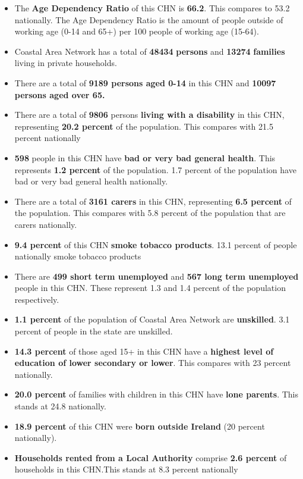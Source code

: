 \documentclass{article}
\begin{document}
\begin{itemize}

\item The \textbf{Age Dependency Ratio} of this CHN is  \textbf{66.2}. This compares to 53.2 nationally. The Age Dependency Ratio is the amount of people outside of working age (0-14 and 65+) per 100 people of working age (15-64). 

\item Coastal Area Network has a total of \textbf{\num{48434}} \textbf{persons} and  \textbf{\num{13274}} \textbf{families} living in private households.

\item There are a total of \textbf{\num{9189} persons aged 0-14} in this CHN and \textbf{\num{10097} persons aged over 65.} 

\item There are a total of \textbf{\num{9806}} persons \textbf{living with a disability} in this CHN, representing \textbf{20.2 percent} of the population. This compares with  21.5 percent nationally

\item \textbf{\num{598}} people in this CHN have \textbf{bad or very bad general health}. This represents \textbf{1.2 percent} of the population. 1.7 percent of the population have bad or very bad general health nationally. 

\item There are a total of \textbf{\num{3161} carers} in this CHN, representing \textbf{6.5 percent} of the population. This compares with 5.8 percent of the population that are carers nationally. 

\item \textbf{9.4 percent} of this CHN \textbf{smoke tobacco products}. 13.1 percent of people nationally smoke tobacco products

\item There are \textbf{\num{499} short term unemployed} and \textbf{\num{567} long term unemployed} people in this CHN. These represent 1.3 and 1.4 percent of the population respectively.

\item  \textbf{1.1 percent} of the population of Coastal Area Network are \textbf{unskilled}. 3.1 percent of people in the state are unskilled.

\item \textbf{14.3 percent} of those aged 15+ in this CHN have a \textbf{highest level of education of lower secondary or lower}. This compares with 23 percent nationally. 

\item \textbf{20.0 percent} of families with children in this CHN have \textbf{lone parents}. This stands at 24.8 nationally.

\item \textbf{18.9 percent} of this CHN were \textbf{born outside Ireland} (20 percent nationally).

\item \textbf{Households rented from a Local Authority} comprise \textbf{2.6 percent} of households in this CHN.This stands at 8.3 percent nationally

\end{itemize}
\end{document}
